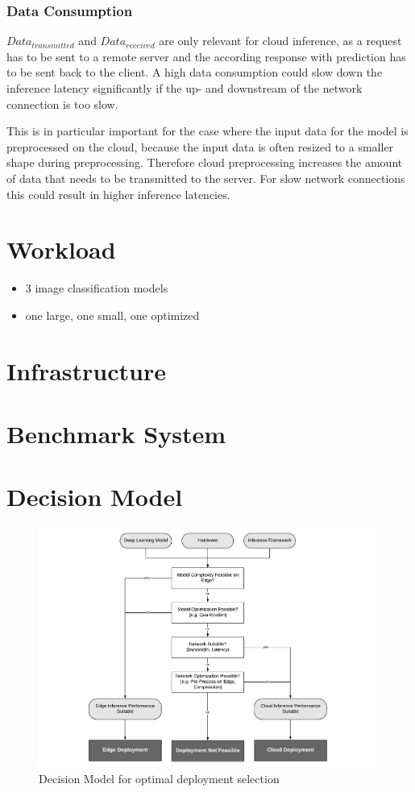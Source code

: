 \subsubsection{Data Consumption}
$Data_{transmitted}$ and $Data_{received}$ are only relevant for cloud inference, as a request has to be sent to a remote server and the according response with prediction has to be sent back to the client. A high data consumption could slow down the inference latency significantly if the up- and downstream of the network connection is too slow. 

This is in particular important for the case where the input data for the model is preprocessed on the cloud, because the input data is often resized to a smaller shape during preprocessing. Therefore cloud preprocessing increases the amount of data that needs to be transmitted to the server. For slow network connections this could result in higher inference latencies.



\section{Workload}
\begin{itemize}
    \item 3 image classification models
    \item one large, one small, one optimized
\end{itemize}
\section{Infrastructure}

\section{Benchmark System}


\section{Decision Model}
\begin{figure}[H]
\centering
\includegraphics[width=0.99\textwidth]{./Bilder/DecisionModel.pdf}
\caption{Decision Model for optimal deployment selection}
\label{fig:DecisionModel}
\end{figure}



